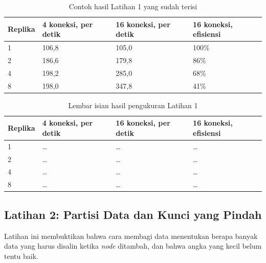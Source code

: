 \begin{table}[!htb]
  \centering
  \caption{Contoh hasil Latihan 1 yang sudah terisi}
  \label{tab:c14-lat1-contoh}
  \begin{tabularx}{\textwidth}{Xlll}
    \hline
    \textbf{Replika} & \textbf{4 koneksi, per detik} & \textbf{16 koneksi, per detik} & \textbf{16 koneksi, efisiensi} \\
    \hline
    1 & 106,8 & 105,0 & 100\% \\
    \hline
    2 & 186,6 & 179,8 & 86\% \\
    \hline
    4 & 198,2 & 285,0 & 68\% \\
    \hline
    8 & 198,0 & 347,8 & 41\% \\
    \hline
  \end{tabularx}
\end{table}

\begin{table}[!htb]
  \centering
  \caption{Lembar isian hasil pengukuran Latihan 1}
  \label{tab:c14-lat1-hasil}
  \begin{tabularx}{\textwidth}{Xlll}
    \hline
    \textbf{Replika} & \textbf{4 koneksi, per detik} & \textbf{16 koneksi, per detik} & \textbf{16 koneksi, efisiensi} \\
    \hline
    1 & \dots & \dots & \dots \\
    \hline
    2 & \dots & \dots & \dots \\
    \hline
    4 & \dots & \dots & \dots \\
    \hline
    8 & \dots & \dots & \dots \\
    \hline
  \end{tabularx}
\end{table}

\subsection*{Latihan 2: Partisi Data dan Kunci yang Pindah}

Latihan ini membuktikan bahwa cara membagi data menentukan berapa banyak data
yang harus disalin ketika \textit{node} ditambah, dan bahwa angka yang kecil belum
tentu baik.

